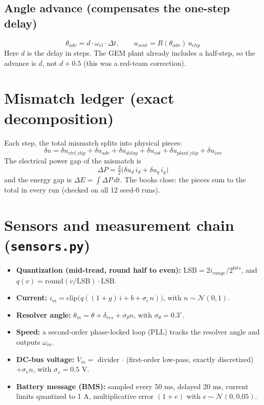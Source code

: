 \documentclass[11pt]{article}
\begin{document}
\subsection*{Angle advance (compensates the one-step delay)}
\begin{equation}
\theta_{adv} = d \cdot \omega_{el}\cdot \Delta t, \qquad u_{sent} = R(\theta_{adv})\, u_{clip}
\end{equation}
Here $d$ is the delay in steps. The GEM plant already includes a half-step, so the advance is $d$, not $d + 0.5$ (this was a red-team correction).

\section{Mismatch ledger (exact decomposition)}
Each step, the total mismatch splits into physical pieces:
\begin{equation}
\delta u = \delta u_{ctrl\_clip} + \delta u_{adv} + \delta u_{delay} + \delta u_{rot} + \delta u_{plant\_clip} + \delta u_{inv}
\end{equation}
The electrical power gap of the mismatch is
\begin{equation}
\Delta P = \tfrac{3}{2}\big(\delta u_d\, i_d + \delta u_q\, i_q\big)
\end{equation}
and the energy gap is $\Delta E = \int \Delta P\, dt$. The books close: the pieces sum to the total in every run (checked on all 12 seed-0 runs).

\section{Sensors and measurement chain (\texttt{sensors.py})}
\begin{itemize}
\item \textbf{Quantization (mid-tread, round half to even):} $\mathrm{LSB} = 2 i_{range}/2^{bits}$, and $q(v) = \mathrm{round}(v/\mathrm{LSB})\cdot\mathrm{LSB}$.
\item \textbf{Current:} $i_m = \mathrm{clip}\big(q((1 + g)\,i + b + \sigma_i\, n)\big)$, with $n \sim \mathcal{N}(0,1)$.
\item \textbf{Resolver angle:} $\theta_m = \theta + \delta_{res} + \sigma_\theta n$, with $\sigma_\theta = 0.3^\circ$.
\item \textbf{Speed:} a second-order phase-locked loop (PLL) tracks the resolver angle and outputs $\omega_m$.
\item \textbf{DC-bus voltage:} $V_m = $ divider $\cdot$ (first-order low-pass, exactly discretized) $+ \sigma_v n$, with $\sigma_v = 0.5$ V.
\item \textbf{Battery message (BMS):} sampled every 50 ms, delayed 20 ms, current limits quantized to 1 A, multiplicative error $(1 + e)$ with $e \sim \mathcal{N}(0, 0.05)$.
\end{itemize}
\end{document}
